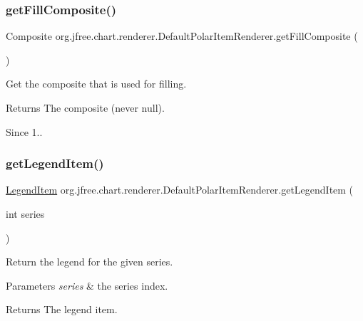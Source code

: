 \subsubsection{\texorpdfstring{get\+Fill\+Composite()}{getFillComposite()}}
{\footnotesize\ttfamily Composite org.\+jfree.\+chart.\+renderer.\+Default\+Polar\+Item\+Renderer.\+get\+Fill\+Composite (\begin{DoxyParamCaption}{ }\end{DoxyParamCaption})}

Get the composite that is used for filling.

\begin{DoxyReturn}{Returns}
The composite (never {\ttfamily null}).
\end{DoxyReturn}
\begin{DoxySince}{Since}
1.. 
\end{DoxySince}
\mbox{\label{classorg_1_1jfree_1_1chart_1_1renderer_1_1_default_polar_item_renderer_ad8ab0846350353938551d224b76c16fb}} 
\subsubsection{\texorpdfstring{get\+Legend\+Item()}{getLegendItem()}}
{\footnotesize\ttfamily \mbox{\hyperlink{classorg_1_1jfree_1_1chart_1_1_legend_item}{Legend\+Item}} org.\+jfree.\+chart.\+renderer.\+Default\+Polar\+Item\+Renderer.\+get\+Legend\+Item (\begin{DoxyParamCaption}\item[{int}]{series }\end{DoxyParamCaption})}

Return the legend for the given series.


\begin{DoxyParams}{Parameters}
{\em series} & the series index.\\
\hline
\end{DoxyParams}
\begin{DoxyReturn}{Returns}
The legend item. 
\end{DoxyReturn}


